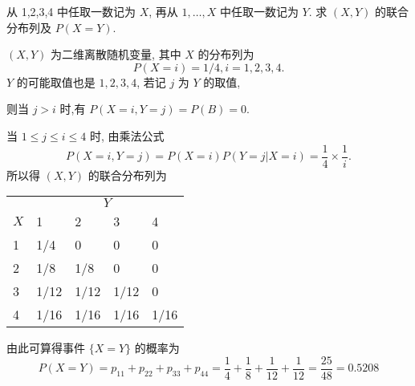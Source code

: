    \begin{example}\label{exam:3.1.2}
   		从 1,2,3,4 中任取一数记为 $X$, 再从 $1,\ldots,X$ 中任取一数记为 $Y$. 求 $(X,Y)$ 的联合分布列及 $P(X=Y)$.
   \end{example}
   \begin{solution}
   		$(X,Y)$ 为二维离散随机变量, 其中 $X$ 的分布列为
         \[
         	 P(X=i)=1/4,i=1,2,3,4.
         \]
		$Y$ 的可能取值也是 $1,2,3,4$, 若记 $j$ 为 $Y$ 的取值,

		 则当 $j>i$ 时,有 $P(X=i,Y=j)=P(B)=0$.

  		当 $1\leq j \leq i \leq 4$ 时, 由乘法公式
  		\[
  		 	P(X=i, Y=j)=P(X=i) P(Y=j | X=i)=\frac{1}{4} \times \frac{1}{i}.
  		\]
		所以得 $(X,Y)$ 的联合分布列为
		\begin{center}
			\begin{tabularx}{0.8\textwidth}{ZZZZZ}
			\toprule
			 &  		 \\
			 $X$&  	1	&  2	&  3&  		4\\
			  	&  1/4	&  0	&  0&  		0\\
			 	&  1/8	& 1/8 	&  0&  		0\\
			 	& 1/12	&  1/12	&  1/12&	0\\
			 &  1/16	&  1/16	&  1/16&  1/16\\
			 \bottomrule
			\end{tabularx}
		\end{center}
		由此可算得事件 $\{X=Y\}$ 的概率为
		\[
		 	P(X=Y)=p_{11}+p_{22}+p_{33}+p_{44}=\frac{1}{4}+\frac{1}{8}+\frac{1}{12}+\frac{1}{12}=\frac{25}{48}=0.5208
		\]
   \end{solution}
